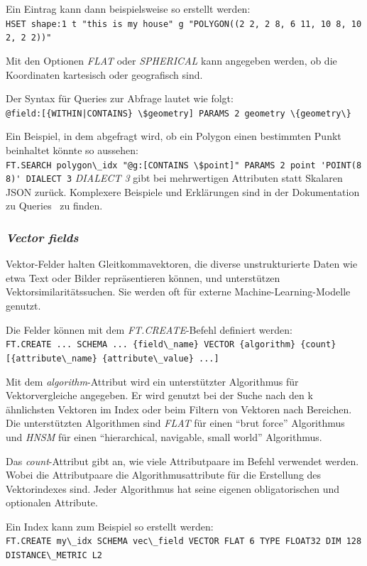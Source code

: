 Ein Eintrag kann dann beispielsweise so erstellt werden:\\
\lstinline|HSET shape:1 t "this is my house" g "POLYGON((2 2, 2 8, 6 11, 10 8, 10 2, 2 2))"|


Mit den Optionen \emph{FLAT} oder \emph{SPHERICAL} kann angegeben werden, ob die Koordinaten kartesisch  oder  geografisch sind.

Der Syntax für Queries zur Abfrage lautet wie folgt:\\
\lstinline+@field:[{WITHIN|CONTAINS} \$geometry] PARAMS 2 geometry \{geometry\}+

Ein Beispiel, in dem abgefragt wird, ob ein Polygon einen bestimmten Punkt beinhaltet könnte so aussehen:\\
\lstinline|FT.SEARCH polygon\_idx "@g:[CONTAINS \$point]" PARAMS 2 point 'POINT(8 8)' DIALECT 3|
\emph{DIALECT 3} gibt bei mehrwertigen Attributen statt Skalaren JSON zurück.
Komplexere Beispiele und Erklärungen sind in der Dokumentation zu Queries~\cite{redis_ltd_query_nodate} zu finden.


\subsubsection{\emph{Vector fields}} Vektor-Felder halten Gleitkommavektoren, die diverse unstrukturierte Daten wie etwa Text oder Bilder repräsentieren können, und unterstützen Vektorsimilaritätssuchen. Sie werden oft für externe Machine-Learning-Modelle genutzt.

Die Felder können mit dem \emph{FT.CREATE}-Befehl definiert werden:\\
\lstinline|FT.CREATE ... SCHEMA ... {field\_name} VECTOR {algorithm} {count} [{attribute\_name} {attribute\_value} ...]|

Mit dem \emph{algorithm}-Attribut wird ein unterstützter Algorithmus für Vektorvergleiche angegeben. Er wird genutzt bei der Suche nach den k ähnlichsten Vektoren im Index oder beim Filtern von Vektoren nach Bereichen. Die unterstützten Algorithmen sind \emph{FLAT} für einen \enquote{brut force} Algorithmus und \emph{HNSM} für einen \enquote{hierarchical, navigable, small world} Algorithmus.

Das \emph{count}-Attribut gibt an, wie viele Attributpaare im Befehl verwendet werden. Wobei die Attributpaare die Algorithmusattribute für die Erstellung des Vektorindexes sind. Jeder Algorithmus hat seine eigenen obligatorischen und optionalen Attribute.

Ein Index kann zum Beispiel so erstellt werden:\\
\lstinline|FT.CREATE my\_idx SCHEMA vec\_field VECTOR FLAT 6 TYPE FLOAT32 DIM 128 DISTANCE\_METRIC L2|

